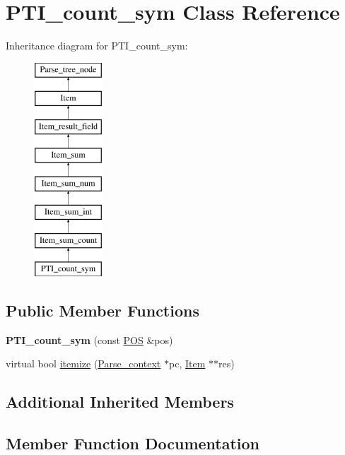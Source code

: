 \hypertarget{classPTI__count__sym}{}\section{P\+T\+I\+\_\+count\+\_\+sym Class Reference}
\label{classPTI__count__sym}
Inheritance diagram for P\+T\+I\+\_\+count\+\_\+sym\+:\begin{figure}[H]
\begin{center}
\leavevmode
\includegraphics[height=8.000000cm]{classPTI__count__sym}
\end{center}
\end{figure}
\subsection*{Public Member Functions}
\begin{DoxyCompactItemize}
\item 
\mbox{\label{classPTI__count__sym_a1432d8f8052ad7f421b37406cb4c0a00}} 
{\bfseries P\+T\+I\+\_\+count\+\_\+sym} (const \mbox{\hyperlink{structYYLTYPE}{P\+OS}} \&pos)
\item 
virtual bool \mbox{\hyperlink{classPTI__count__sym_a2e3569aae8364fa95ead6581bd712a87}{itemize}} (\mbox{\hyperlink{structParse__context}{Parse\+\_\+context}} $\ast$pc, \mbox{\hyperlink{classItem}{Item}} $\ast$$\ast$res)
\end{DoxyCompactItemize}
\subsection*{Additional Inherited Members}


\subsection{Member Function Documentation}
\mbox{\label{classPTI__count__sym_a2e3569aae8364fa95ead6581bd712a87}} 
